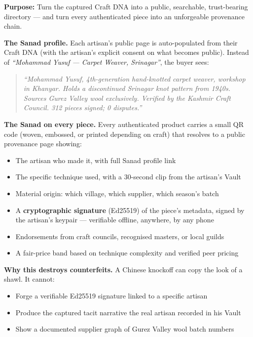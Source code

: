 \documentclass[11pt, a4paper]{article}
\begin{document}
\begin{layerbox}

\textbf{Purpose:} Turn the captured Craft DNA into a public, searchable, trust-bearing directory --- and turn every authenticated piece into an unforgeable provenance chain.

\textbf{The Sanad profile.} Each artisan's public page is auto-populated from their Craft DNA (with the artisan's explicit consent on what becomes public). Instead of {\itshape ``Mohammad Yusuf --- Carpet Weaver, Srinagar''}, the buyer sees:

\begin{quote}
\itshape ``Mohammad Yusuf, 4th-generation hand-knotted carpet weaver, workshop in Khanyar. Holds a discontinued Srinagar knot pattern from 1940s. Sources Gurez Valley wool exclusively. Verified by the Kashmir Craft Council. 312 pieces signed; 0 disputes.''
\end{quote}

\textbf{The Sanad on every piece.} Every authenticated product carries a small QR code (woven, embossed, or printed depending on craft) that resolves to a public provenance page showing:

\begin{itemize}
  \item The artisan who made it, with full Sanad profile link
  \item The specific technique used, with a 30-second clip from the artisan's Vault
  \item Material origin: which village, which supplier, which season's batch
  \item A \textbf{cryptographic signature} (Ed25519) of the piece's metadata, signed by the artisan's keypair --- verifiable offline, anywhere, by any phone
  \item Endorsements from craft councils, recognised masters, or local guilds
  \item A fair-price band based on technique complexity and verified peer pricing
\end{itemize}

\textbf{Why this destroys counterfeits.} A Chinese knockoff can copy the look of a shawl. It cannot:
\begin{itemize}
  \item Forge a verifiable Ed25519 signature linked to a specific artisan
  \item Produce the captured tacit narrative the real artisan recorded in his Vault
  \item Show a documented supplier graph of Gurez Valley wool batch numbers
\end{itemize}


\end{layerbox}
\end{document}
